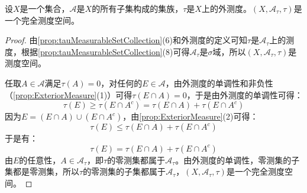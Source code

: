 \begin{theorem}\label{theo:ExteriorMeasureCompleteSpace}
	设$X$是一个集合，$\mathscr{A}$是$X$的所有子集构成的集族，$\tau$是$X$上的外测度。$(X,\mathscr{A}_{\tau},\tau)$是一个完全测度空间。
\end{theorem}
\begin{proof}
	由\cref{prop:tauMeasurableSetCollection}(6)和外测度的定义可知$\tau$是$\mathscr{A}_{\tau}$上的测度，根据\cref{prop:tauMeasurableSetCollection}(8)可得$\mathscr{A}_\tau$是$\sigma$域，所以$(X,\mathscr{A}_\tau,\tau)$是测度空间。\par
	任取$A\in \mathscr{A}$满足$\tau(A)=0$，对任何的$E\in \mathscr{A}$，由外测度的单调性和非负性（\cref{prop:ExteriorMeasure}(1)）可得$\tau(E\cap A)=0$，于是由外测度的单调性可得：
	\begin{equation*}
		\tau(E)\geqslant\tau(E\cap A^c)=\tau(E\cap A)+\tau(E\cap A^c)
	\end{equation*}
	因为$E=(E\cap A)\cup(E\cap A^c)$，由\cref{prop:ExteriorMeasure}(2)可得：
	\begin{equation*}
		\tau(E)\leqslant\tau(E\cap A)+\tau(E\cap A^c)
	\end{equation*}
	于是有：
	\begin{equation*}
		\tau(E)=\tau(E\cap A)+\tau(E\cap A^c)
	\end{equation*}
	由$E$的任意性，$A\in \mathscr{A}_{\tau}$，即$\tau$的零测集都属于$\mathscr{A}_{\tau}$。由外测度的单调性，零测集的子集都是零测集，所以$\tau$的零测集的子集都属于$\mathscr{A}_{\tau}$，$(X,\mathscr{A}_{\tau},\tau)$是一个完全测度空间。
\end{proof}

